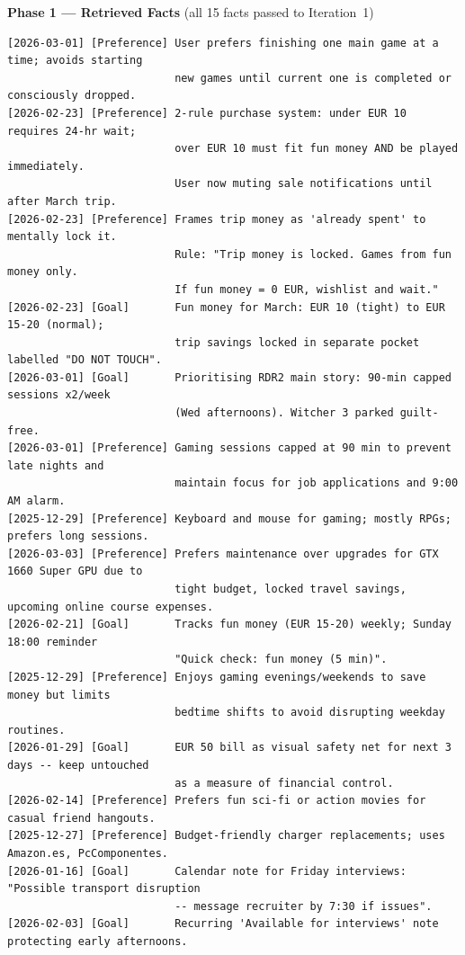 \vspace{0.5em}
\noindent\textbf{Phase 1 --- Retrieved Facts} {\small(all 15 facts passed to Iteration~1)}
\begin{lstlisting}[style=appendixbox]
[2026-03-01] [Preference] User prefers finishing one main game at a time; avoids starting
                          new games until current one is completed or consciously dropped.
[2026-02-23] [Preference] 2-rule purchase system: under EUR 10 requires 24-hr wait;
                          over EUR 10 must fit fun money AND be played immediately.
                          User now muting sale notifications until after March trip.
[2026-02-23] [Preference] Frames trip money as 'already spent' to mentally lock it.
                          Rule: "Trip money is locked. Games from fun money only.
                          If fun money = 0 EUR, wishlist and wait."
[2026-02-23] [Goal]       Fun money for March: EUR 10 (tight) to EUR 15-20 (normal);
                          trip savings locked in separate pocket labelled "DO NOT TOUCH".
[2026-03-01] [Goal]       Prioritising RDR2 main story: 90-min capped sessions x2/week
                          (Wed afternoons). Witcher 3 parked guilt-free.
[2026-03-01] [Preference] Gaming sessions capped at 90 min to prevent late nights and
                          maintain focus for job applications and 9:00 AM alarm.
[2025-12-29] [Preference] Keyboard and mouse for gaming; mostly RPGs; prefers long sessions.
[2026-03-03] [Preference] Prefers maintenance over upgrades for GTX 1660 Super GPU due to
                          tight budget, locked travel savings, upcoming online course expenses.
[2026-02-21] [Goal]       Tracks fun money (EUR 15-20) weekly; Sunday 18:00 reminder
                          "Quick check: fun money (5 min)".
[2025-12-29] [Preference] Enjoys gaming evenings/weekends to save money but limits
                          bedtime shifts to avoid disrupting weekday routines.
[2026-01-29] [Goal]       EUR 50 bill as visual safety net for next 3 days -- keep untouched
                          as a measure of financial control.
[2026-02-14] [Preference] Prefers fun sci-fi or action movies for casual friend hangouts.
[2025-12-27] [Preference] Budget-friendly charger replacements; uses Amazon.es, PcComponentes.
[2026-01-16] [Goal]       Calendar note for Friday interviews: "Possible transport disruption
                          -- message recruiter by 7:30 if issues".
[2026-02-03] [Goal]       Recurring 'Available for interviews' note protecting early afternoons.
\end{lstlisting}

